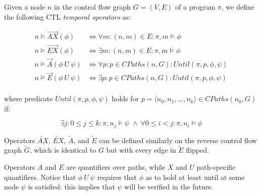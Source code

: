 \begin{definition}
Given a node $n$ in the control flow graph $G=(V,E)$ of a program $\pi$, we define the following CTL {\em temporal operators} as:

\begin{align*}
n \models \overrightarrow{AX}(\phi) &\Longleftrightarrow \forall m: (n,m)\in E: \pi,m\models\phi \\
n \models \overrightarrow{EX}(\phi) &\Longleftrightarrow \exists m: (n,m)\in E: \pi, m\models\phi \\
n \models \overrightarrow{A}(\phi~U~\psi) &\Longleftrightarrow \forall p: p\in CPaths(n,G): Until(\pi, p,\phi,\psi) \\
n \models \overrightarrow{E}(\phi~U~\psi) &\Longleftrightarrow \exists p: p\in CPaths(n,G): Until(\pi, p,\phi,\psi) \\
\end{align*}

\vspace{-0.5em}
\noindent where predicate $Until(\pi,p,\phi,\psi)$ holds for $p = \langle n_0,n_1,\ldots,n_k\rangle \in CPaths(n_0,G)$ if:
\vspace{-0.5em}

\begin{equation*}
\exists j: 0 \le j\le k: \pi, n_j \models \psi \; \wedge \: \forall 0 \le i < j: \pi, n_i \models \phi
\end{equation*}

\noindent Operators $\overleftarrow{AX}$, $\overleftarrow{EX}$, $\overleftarrow{A}$, and $\overleftarrow{E}$ can be defined similarly on the reverse control flow graph $\overleftarrow{G}$, which is identical to $G$ but with every edge in $\overleftarrow{E}$ flipped.
\end{definition}

\noindent Operators $A$ and $E$ are quantifiers over paths, while $X$ and $U$ path-specific quantifiers. Notice that $\phi~U~\psi$ requires that $\phi$ as to hold at least until at some node $\psi$ is satisfied: this implies that $\psi$ will be verified in the future.

